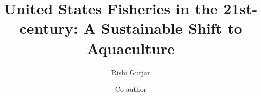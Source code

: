 \documentclass[9pt,arxiv,lineno,blue]{lapreprint}
\title{United States Fisheries in the 21st-century: A Sustainable Shift to Aquaculture}
\author[ \orcidlink{0000-0002-1140-7573} 1 \Letter]{Rishi Gurjar}
\author[2]{Co-author}
\affil[1]{American High School}
\affil[2]{University of Somewhere}
\begin{document}
\maketitle








\if@endfloat\clearpage\processdelayedfloats\clearpage\fi 



\begin{appendix}
\begin{appendixbox}\label{app:ttt}
    
\end{appendixbox}
\begin{appendixbox}
    
\end{appendixbox}
\end{appendix}


\end{document}
